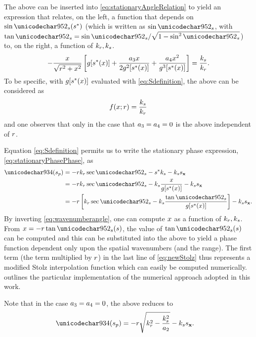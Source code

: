 The above can be inserted into \eqref{eq:stationaryAngleRelation} to yield an expression that relates, on the left, a function that depends on $\sin\thetas(\myparm)$ (which is written as $\sin\thetas$, with $\tan\thetas=\sin\thetas/\sqrt{1-\sin^2\thetas}$) to, on the right, a function of $k_r, k_{s}$.
\begin{equation}
 -\frac{\xang}{\sqrt{\targetrange^2+\xang^2}}\left[\gfunc[\myparm(\xang)] + \frac{\rcoeff_3\xang}{2\gfunc^2[\myparm(\xang)]} + \frac{\rcoeff_4\xang^2}{\gfunc^3[\myparm(\xang)]}\right] = \frac{\kparm}{\kr}.
 \label{eq:angleRelation}
\end{equation}
To be specific, with $g[s^*(x)]$ evaluated with \eqref{eq:Sdefinition}, the above can be considered as
\begin{equation}
 f(\xang; r) = \frac{\kparm}{\kr}
 \label{eq:wavenumberangle}
\end{equation}
and one observes that only in the case that $a_3=a_4=0$ is the above independent of $r$.
\par
Equation \eqref{eq:Sdefinition} permits us to write the stationary phase expression, \eqref{eq:stationaryPhasePhase}, as
\begin{equation}
\begin{split}
 \Phi(\stationaryparm) &= -\targetrange\kr\sec\thetas - \myparm\kparm - \kparm\targetxparm\\
 &= -\targetrange\kr\sec\thetas - \kparm\frac{\xang}{\gfunc[\myparm(\xang)]} - \kparm\targetxparm\\
 &= -\targetrange\left[\kr\sec\thetas - \kparm\frac{\tan\thetas}{\gfunc[\myparm(\xang)]}\right] - \kparm\targetxparm.
 \label{eq:newStolz}
 \end{split}
\end{equation}
By inverting \eqref{eq:wavenumberangle}, one can compute $x$ as a function of $k_r, k_{s}$. From $\xang=-\targetrange\tan\thetas(\parm)$, the value of $\tan\thetas(\parm)$ can be computed and this can be substituted into the above to yield a phase function dependent only upon the spatial wavenumbers (and the range). The first term (the term multiplied by $r$) in the last line of \eqref{eq:newStolz} thus represents a modified Stolz interpolation function which can easily be computed numerically.  outlines the particular implementation of the numerical approach adopted in this work. 
\par
Note that in the case $a_3=a_4=0$, the above reduces to
\begin{equation}
\begin{split}
 \Phi(\stationaryparm) &= -\targetrange\sqrt{\kr^2 - \frac{\kparm^2}{\rcoeff_2}} - \kparm\targetxparm.
 \label{eq:oldStolz}
 \end{split}
\end{equation}
